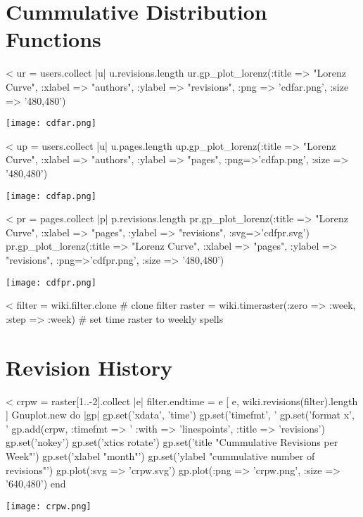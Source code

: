 \documentclass{scrartcl}
\begin{document}




\section{Cummulative Distribution Functions} %
\label{sec:cummulative_distribution_functions}

<%
ur = users.collect { |u| u.revisions.length }
ur.gp_plot_lorenz(:title => "Lorenz Curve", :xlabel => "authors",
 :ylabel => "revisions", :png => 'cdfar.png', :size => '480,480')
\begin{center}
  \texttt{[image: cdfar.png]}
\end{center}

<%
up = users.collect { |u| u.pages.length }
up.gp_plot_lorenz(:title => "Lorenz Curve", :xlabel => "authors", :ylabel => "pages", :png=>'cdfap.png', :size => '480,480')
\begin{center}
  \texttt{[image: cdfap.png]}
\end{center}

<%
pr = pages.collect { |p| p.revisions.length }
pr.gp_plot_lorenz(:title => "Lorenz Curve", :xlabel => "pages", :ylabel => "revisions", :svg=>'cdfpr.svg')
pr.gp_plot_lorenz(:title => "Lorenz Curve", :xlabel => "pages", :ylabel => "revisions", :png=>'cdfpr.png', :size => '480,480')
\begin{center}
  \texttt{[image: cdfpr.png]}
\end{center}



<%
filter = wiki.filter.clone # clone filter
raster = wiki.timeraster(:zero => :week, :step => :week) # set time raster to weekly spells

\section{Revision History} %
\label{sec:revision_history}

<%
crpw = raster[1..-2].collect { |e| filter.endtime = e 
	[ e, wiki.revisions(filter).length ]
	}
Gnuplot.new do |gp|
	gp.set('xdata', 'time')
	gp.set('timefmt', '%
	gp.set('format x', '%
	gp.add(crpw, :timefmt => '%
		:with => 'linespoints', 
		:title => 'revisions')
	gp.set('nokey')
	gp.set('xtics rotate')
	gp.set('title "Cummulative Revisions per Week"')
	gp.set('xlabel "month"')
	gp.set('ylabel "cummulative number of revisions"')
	gp.plot(:svg => 'crpw.svg')
	gp.plot(:png => 'crpw.png', :size => '640,480')
end
\begin{center}
  \texttt{[image: crpw.png]}
\end{center}
\end{document}
